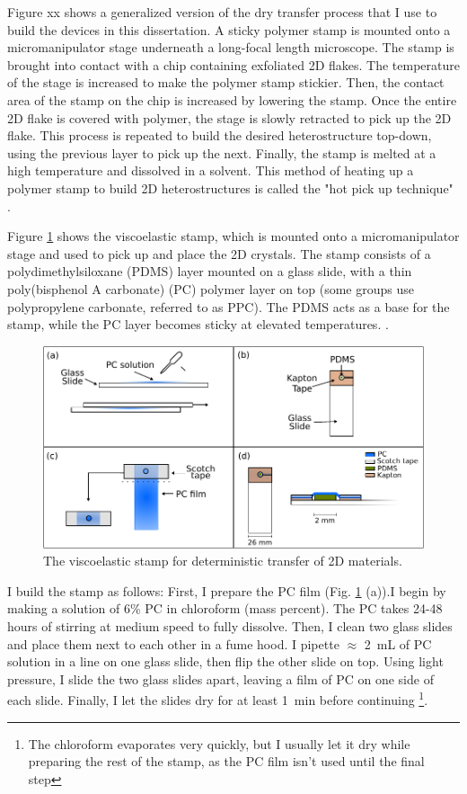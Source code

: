 \documentclass[double,12pt,1in]{beavtex}
\begin{document}
Figure xx shows a generalized version of the dry transfer process that I use to build the devices in this dissertation.  A sticky polymer stamp is mounted onto a micromanipulator stage underneath a long-focal length microscope. The stamp is brought into contact with a chip containing exfoliated 2D flakes. The temperature of the stage is increased to make the polymer stamp stickier. Then, the contact area of the stamp on the chip is increased by lowering the stamp. Once the entire 2D flake is covered with polymer, the stage is slowly retracted to pick up the 2D flake. This process is repeated to build the desired heterostructure top-down, using the previous layer to pick up the next. Finally, the stamp is melted at a high temperature and dissolved in a solvent. This method of heating up a polymer stamp to build 2D heterostructures is called the "hot pick up technique" \cite{pizzocchero_hot_2016}.

Figure \ref{stamp diagram} shows the viscoelastic stamp, which is mounted onto a micromanipulator stage and used to pick up and place the 2D crystals. The stamp consists of a polydimethylsiloxane (PDMS) layer mounted on a glass slide, with a thin poly(bisphenol A carbonate) (PC) polymer layer on top (some groups use polypropylene carbonate, referred to as PPC). The PDMS acts as a base for the stamp, while the PC layer becomes sticky at elevated temperatures. .


\begin{figure}
    \includegraphics[width = 1\textwidth]{stamp making diagram.pdf}
    \caption{The viscoelastic stamp for deterministic transfer of 2D materials.}
    \label{stamp diagram}
\end{figure}


I build the stamp as follows: First, I prepare the PC film (Fig. \ref{stamp diagram} (a)).I begin by making a solution of 6\% PC in chloroform (mass percent). The PC takes 24-48 hours of stirring at medium speed to fully dissolve. Then, I clean two glass slides and place them next to each other in a fume hood. I pipette $\approx$ \SI{2}{\milli\liter} of PC solution in a line on one glass slide, then flip the other slide on top. Using light pressure, I slide the two glass slides apart, leaving a film of PC on one side of each slide. Finally, I let the slides dry for at least \SI{1}{\minute} before continuing \footnote{The chloroform evaporates very quickly, but I usually let it dry while preparing the rest of the stamp, as the PC film isn't used until the final step}.
\end{document}
